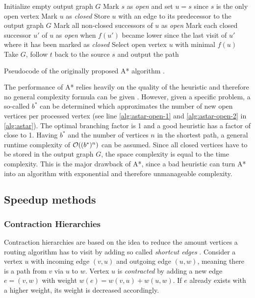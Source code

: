 			\begin{algorithm}[h]
				\begin{algorithmic}[1]
					\State Initialize empty output graph $G$
					\State Mark $s$ as \emph{open} and set $u = s$ since $s$ is the only open vertex
						\State Mark $u$ as \emph{closed}
						\State Store $u$ with an edge to its predecessor to the output graph $G$
						\State Mark all non-closed successors of $u$ as \emph{open} \label{alg:astar-open-1}
						\State Mark each closed successor $u'$ of $u$ as \emph{open} when $f(u')$ became lower since the last visit of $u'$ where it has been marked as \emph{closed} \label{alg:astar-open-2}
						\State Select open vertex $u$ with minimal $f(u)$
					\EndWhile
					\State Take $G$, follow $t$ back to the source $s$ and output the path
				\end{algorithmic}
				\caption{Pseudocode of the originally proposed A* algorithm \cite{astar}.}
				\label{alg:astar}
			\end{algorithm}
			
			The performance of A* relies heavily on the quality of the heuristic and therefore no general complexity formula can be given \cite{russell-norvig-ai-modern-approach}.
			However, given a specific problem, a so-called  $b^*$ can be determined which approximates the number of new open vertices per processed vertex (see line \ref{alg:astar-open-1} and \ref{alg:astar-open-2} in \cref{alg:astar}).
			The optimal branching factor is 1 and a good heuristic has a factor of close to 1.
			Having $b^*$ and the number of vertices $n$ in the shortest path, a general runtime complexity of $\mathcal{O}((b^*)^n)$ can be assumed.
			Since all closed vertices have to be stored in the output graph $G$, the space complexity is equal to the time complexity.
			This is the major drawback of A*, since a bad heuristic can turn A* into an algorithm with exponential and therefore unmanageable complexity.
		
	\subsection{Speedup methods}
	\label{subsec:speedup-methods}
		
		\subsubsection{Contraction Hierarchies}
		\label{subsubsec:ch}
		
			Contraction hierarchies are based on the idea to reduce the amount vertices a routing algorithm has to visit by adding so called \emph{shortcut edges} \cite{geisberger-contraction-hierarchies}.
			Consider a vertex $u$ with incoming edge $(v, u)$ and outgoing edge $(u, w)$, meaning there is a path from $v$ via $u$ to $w$.
			Vertex $u$ is \emph{contracted} by adding a new edge $e = (v, w)$ with weight $w(e) = w(v, u) + w(u, w)$.
			If $e$ already exists with a higher weight, its weight is decreased accordingly.
			
